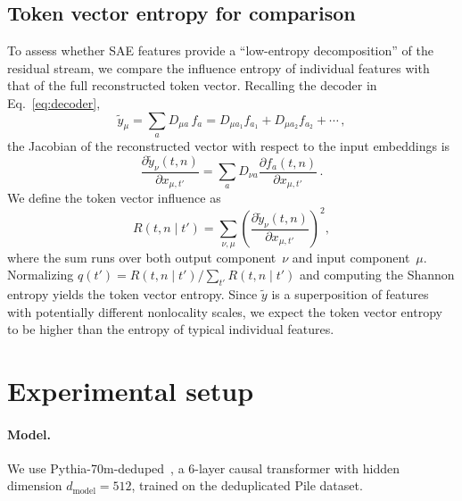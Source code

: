 \documentclass{article}
\begin{document}
\subsection{Token vector entropy for comparison}
\label{sec:token_entropy}

To assess whether SAE features provide a ``low-entropy decomposition'' of
the residual stream, we compare the influence entropy of individual
features with that of the full reconstructed token vector. Recalling the
decoder in Eq.~\eqref{eq:decoder},
\begin{equation}
    \label{eq:decoder_decomp}
    \tilde{y}_\mu
    = \sum_a D_{\mu a}\, f_a
    = D_{\mu a_1} f_{a_1} + D_{\mu a_2} f_{a_2} + \cdots\,,
\end{equation}
the Jacobian of the reconstructed vector with respect to the input
embeddings is
\begin{equation}
    \label{eq:token_jacobian}
    \frac{\partial \tilde{y}_\nu(t,n)}{\partial x_{\mu,t'}}
    = \sum_a D_{\nu a}
    \frac{\partial f_a(t,n)}{\partial x_{\mu,t'}}\,.
\end{equation}
We define the token vector influence as
\begin{equation}
    \label{eq:token_influence}
    R(t,n \mid t')
    = \sum_{\nu,\mu}
    \left(\frac{\partial \tilde{y}_\nu(t,n)}{\partial x_{\mu,t'}}\right)^{\!2},
\end{equation}
where the sum runs over both output component~$\nu$ and input
component~$\mu$. Normalizing
$q(t') = R(t,n \mid t') \big/ \sum_{t'} R(t,n \mid t')$ and computing
the Shannon entropy yields the token vector entropy. Since $\tilde{y}$ is
a superposition of features with potentially different nonlocality scales,
we expect the token vector entropy to be higher than the entropy of typical
individual features.

\section{Experimental setup}
\label{sec:setup}

\paragraph{Model.}
We use Pythia-70m-deduped~\citep{biderman2023pythia}, a 6-layer causal
transformer with hidden dimension $d_{\mathrm{model}} = 512$, trained on
the deduplicated Pile dataset.
\end{document}
